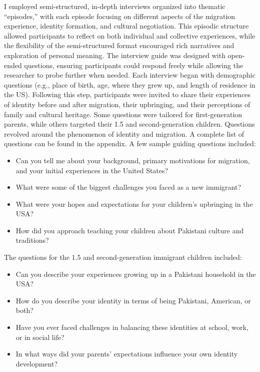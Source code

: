 I employed semi-structured, in-depth interviews organized into thematic “episodes,” with each episode focusing on different aspects of the migration experience, identity formation, and cultural negotiation. This episodic structure allowed participants to reflect on both individual and collective experiences, while the flexibility of the semi-structured format encouraged rich narratives and exploration of personal meaning.
The interview guide was designed with open-ended questions, ensuring participants could respond freely while allowing the researcher to probe further when needed. Each interview began with demographic questions (e.g., place of birth, age, where they grew up, and length of residence in the US). Following this step, participants were invited to share their experiences of identity before and after migration, their upbringing, and their perceptions of family and cultural heritage. Some questions were tailored for first-generation parents, while others targeted their 1.5 and second-generation children. Questions revolved around the phenomenon of identity and migration. A complete list of questions can be found in the appendix. A few sample guiding questions included: 

\begin{itemize}
    \item Can you tell me about your background, primary motivations for migration, and your initial experiences in the United States? 
    \item What were some of the biggest challenges you faced as a new immigrant?
    \item What were your hopes and expectations for your children’s upbringing in the USA?
    \item How did you approach teaching your children about Pakistani culture and traditions?
\end{itemize}

The questions for the 1.5 and second-generation immigrant children included:

\begin{itemize}
    \item Can you describe your experiences growing up in a Pakistani household in the USA?
    \item How do you describe your identity in terms of being Pakistani, American, or both?
    \item Have you ever faced challenges in balancing these identities at school, work, or in social life?
    \item In what ways did your parents’ expectations influence your own identity development?
\end{itemize}

